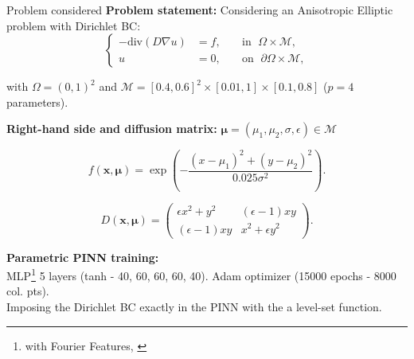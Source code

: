 \begin{frame}{Problem considered} 
	\textbf{Problem statement:} Considering an Anisotropic Elliptic problem with Dirichlet BC:
	\vspace{-5pt}
	\begin{equation*}
		\left\{
		\begin{aligned}
			-\text{div}(D\nabla u) & = f, \; &  & \text{in } \; \Omega\times \mathcal{M}, \\
			u         & =0, \;  &  & \text{on } \; \partial\Omega\times \mathcal{M},
		\end{aligned}
		\right.
	\end{equation*}

	with $\Omega=(0,1)^2$ and $\mathcal{M}=[0.4, 0.6]^2\times [0.01,1]\times [0.1,0.8]$ ($p=4$ parameters).
	
	\vspace{8pt}
	\textbf{Right-hand side and diffusion matrix:} \; $\bm{\mu}=(\mu_1,\mu_2,\sigma,\epsilon)\in\mathcal{M}$

	\begin{equation*}
		f(\bm{x},\bm{\mu})=\exp\left(-\frac{(x-\mu_1)^2+(y-\mu_2)^2}{0.025\sigma^2}\right).
	\end{equation*}
	
	\begin{equation*}
		D(\bm{x},\bm{\mu})=\begin{pmatrix}
			\epsilon x^2+y^2 & (\epsilon-1)xy \\
			(\epsilon-1)xy & x^2+\epsilon y^2
		\end{pmatrix}.
	\end{equation*}

	\vspace{2pt}
	\textbf{Parametric PINN training:} \\ MLP\footnote[frame,1]{with Fourier Features, \cite{TanSri2020}} 5 layers (tanh - 40, 60, 60, 60, 40).	Adam optimizer (15000 epochs - 8000 col. pts). \\
	Imposing the Dirichlet BC exactly in the PINN with the a level-set function.

	\vspace{5pt}
\end{frame}

